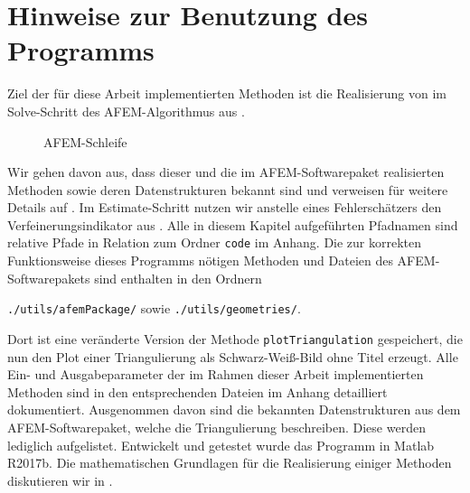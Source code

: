 \section{Hinweise zur Benutzung des Programms}
Ziel der für diese Arbeit implementierten Methoden ist die Realisierung von
 im Solve-Schritt des AFEM-Algorithmus aus
. 
\begin{figure}
  \centering
  
  \caption{AFEM-Schleife}
  \label{fig:afemLoop}
\end{figure}
Wir gehen davon aus, dass dieser und die im AFEM-Softwarepaket \cite{Car09}
realisierten Methoden sowie deren Datenstrukturen bekannt sind und verweisen
für weitere Details auf \cite{CGKNRR10}. 
Im Estimate-Schritt nutzen wir anstelle eines Fehlerschätzers den
Verfeinerungsindikator aus .
Alle in diesem Kapitel aufgeführten Pfadnamen sind relative Pfade in Relation
zum Ordner \texttt{code} im Anhang.
Die zur korrekten Funktionsweise dieses Programms nötigen Methoden und
Dateien des AFEM-Softwarepakets sind enthalten in den Ordnern
\begin{center}
    \texttt{./utils/afemPackage/} sowie \texttt{./utils/geometries/}.
\end{center}
Dort ist eine veränderte Version der Methode \texttt{plotTriangulation}
gespeichert, die nun den Plot einer Triangulierung als Schwarz-Weiß-Bild ohne
Titel erzeugt.
Alle Ein- und Ausgabeparameter der im Rahmen dieser Arbeit implementierten
Methoden sind in den entsprechenden Dateien im Anhang detailliert dokumentiert. 
Ausgenommen davon sind die bekannten Datenstrukturen aus dem
AFEM-Softwarepaket, welche die Triangulierung beschreiben. 
Diese werden lediglich aufgelistet.
Entwickelt und getestet wurde das Programm in Matlab R2017b.
Die mathematischen Grundlagen für die Realisierung einiger Methoden diskutieren
wir in .


